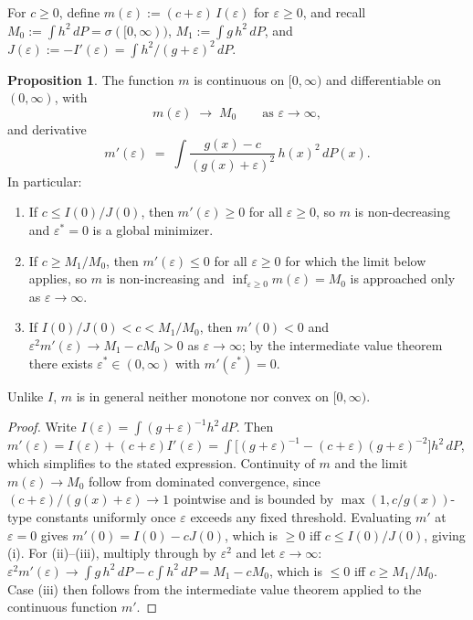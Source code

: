 \documentclass[11pt,reqno]{amsart}
\theoremstyle{definition}
\newtheorem{prop}[thm]{Proposition}
\newcommand{\note}[1]{{\color{Sienna} #1}}
\begin{document}
\note{
For $c \ge 0$, define $m(\varepsilon) := (c+\varepsilon)\,I(\varepsilon)$ for $\varepsilon \ge 0$, and recall
$M_0 := \int h^2\,dP = \sigma([0,\infty))$, $M_1 := \int g\,h^2\,dP$, and
$J(\varepsilon) := -I'(\varepsilon) = \int h^2/(g+\varepsilon)^2\,dP$.

\begin{prop}\label{prop:m-shape}
The function $m$ is continuous on $[0,\infty)$ and differentiable on $(0,\infty)$, with
\[
m(\varepsilon) \;\longrightarrow\; M_0 \qquad \text{as } \varepsilon \to \infty,
\]
and derivative
\[
m'(\varepsilon) \;=\; \int \frac{g(x)-c}{(g(x)+\varepsilon)^2}\,h(x)^2\,dP(x).
\]
In particular:
\begin{enumerate}
\item[(i)] If $c \le I(0)/J(0)$, then $m'(\varepsilon) \ge 0$ for all $\varepsilon \ge 0$, so $m$ is non-decreasing and $\varepsilon^\ast = 0$ is a global minimizer.
\item[(ii)] If $c \ge M_1/M_0$, then $m'(\varepsilon) \le 0$ for all $\varepsilon \ge 0$ for which the limit below applies, so $m$ is non-increasing and $\inf_{\varepsilon\ge0} m(\varepsilon) = M_0$ is approached only as $\varepsilon \to \infty$.
\item[(iii)] If $I(0)/J(0) < c < M_1/M_0$, then $m'(0) < 0$ and $\varepsilon^2 m'(\varepsilon) \to M_1 - cM_0 > 0$ as $\varepsilon\to\infty$; by the intermediate value theorem there exists $\varepsilon^\ast \in (0,\infty)$ with $m'(\varepsilon^\ast) = 0$.
\end{enumerate}
Unlike $I$, $m$ is in general neither monotone nor convex on $[0,\infty)$.
\end{prop}

\begin{proof}
Write $I(\varepsilon) = \int (g+\varepsilon)^{-1} h^2\,dP$. Then
$m'(\varepsilon) = I(\varepsilon) + (c+\varepsilon) I'(\varepsilon) = \int \big[(g+\varepsilon)^{-1} - (c+\varepsilon)(g+\varepsilon)^{-2}\big] h^2\,dP$,
which simplifies to the stated expression. Continuity of $m$ and the limit $m(\varepsilon)\to M_0$ follow from dominated convergence, since $(c+\varepsilon)/(g(x)+\varepsilon) \to 1$ pointwise and is bounded by $\max(1, c/g(x))$-type constants uniformly once $\varepsilon$ exceeds any fixed threshold. Evaluating $m'$ at $\varepsilon=0$ gives $m'(0) = I(0) - cJ(0)$, which is $\ge 0$ iff $c \le I(0)/J(0)$, giving (i). For (ii)--(iii), multiply through by $\varepsilon^2$ and let $\varepsilon\to\infty$: $\varepsilon^2 m'(\varepsilon) \to \int g\,h^2\,dP - c\int h^2\,dP = M_1 - cM_0$, which is $\le 0$ iff $c \ge M_1/M_0$. Case (iii) then follows from the intermediate value theorem applied to the continuous function $m'$.
\end{proof}

}
\end{document}
